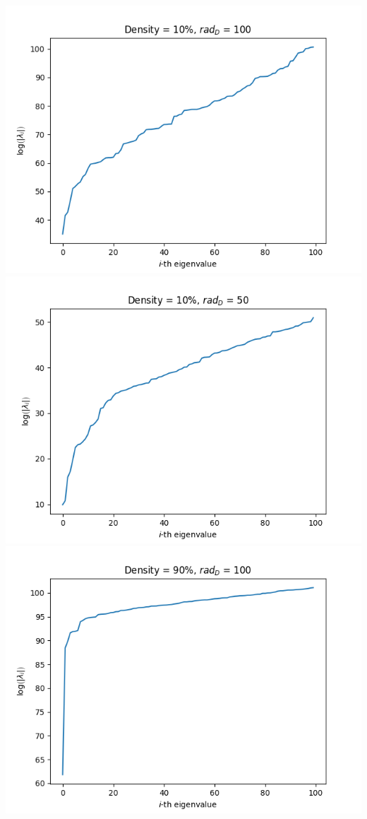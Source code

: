 \documentclass[12pt]{article}
\newcommand{\1}{\mathbbm{1}}
\begin{document}
{\includegraphics[scale=0.5, H]{eigen-100-10-100.png}
\includegraphics[scale=0.5, H]{eigen-100-10-50.png}
\includegraphics[scale=0.5, H]{eigen-100-90-100.png}
}
\end{document}
